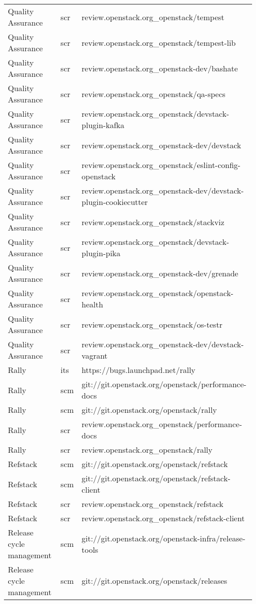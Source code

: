 \begin{center}
\begin{longtable}{|p{4cm}|p{1cm}|p{10cm}|}
Quality Assurance&scr&review.openstack.org\_openstack/tempest\\ 
Quality Assurance&scr&review.openstack.org\_openstack/tempest-lib\\ 
Quality Assurance&scr&review.openstack.org\_openstack-dev/bashate\\ 
Quality Assurance&scr&review.openstack.org\_openstack/qa-specs\\ 
Quality Assurance&scr&review.openstack.org\_openstack/devstack-plugin-kafka\\ 
Quality Assurance&scr&review.openstack.org\_openstack-dev/devstack\\ 
Quality Assurance&scr&review.openstack.org\_openstack/eslint-config-openstack\\ 
Quality Assurance&scr&review.openstack.org\_openstack-dev/devstack-plugin-cookiecutter\\ 
Quality Assurance&scr&review.openstack.org\_openstack/stackviz\\ 
Quality Assurance&scr&review.openstack.org\_openstack/devstack-plugin-pika\\ 
Quality Assurance&scr&review.openstack.org\_openstack-dev/grenade\\ 
Quality Assurance&scr&review.openstack.org\_openstack/openstack-health\\ 
Quality Assurance&scr&review.openstack.org\_openstack/os-testr\\ 
Quality Assurance&scr&review.openstack.org\_openstack-dev/devstack-vagrant\\ 
Rally&its&https://bugs.launchpad.net/rally\\ 
Rally&scm&git://git.openstack.org/openstack/performance-docs\\ 
Rally&scm&git://git.openstack.org/openstack/rally\\ 
Rally&scr&review.openstack.org\_openstack/performance-docs\\ 
Rally&scr&review.openstack.org\_openstack/rally\\ 
Refstack&scm&git://git.openstack.org/openstack/refstack\\ 
Refstack&scm&git://git.openstack.org/openstack/refstack-client\\ 
Refstack&scr&review.openstack.org\_openstack/refstack\\ 
Refstack&scr&review.openstack.org\_openstack/refstack-client\\ 
Release cycle management&scm&git://git.openstack.org/openstack-infra/release-tools\\ 
Release cycle management&scm&git://git.openstack.org/openstack/releases\\ 

\end{longtable}
\end{center}

